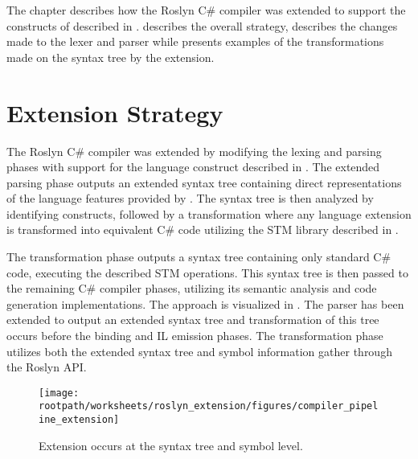 \makeatletter {}\makeatother
{}
The chapter describes how the Roslyn C\# compiler was extended to support the constructs of \stmname described in .  describes the overall strategy,  describes the changes made to the lexer and parser while  presents examples of the transformations made on the syntax tree by the extension.
\label{chap:roslyn_extension}
\section{Extension Strategy}
\label{sec:roslyn_extension_strategy}
The Roslyn C\# compiler was extended by modifying the lexing and parsing phases with support for the language construct described in . The extended parsing phase outputs an extended syntax tree containing direct representations of the language features provided by \stmname. The syntax tree is then analyzed by identifying \stmnamesp constructs, followed by a transformation where any language extension is transformed into equivalent C\# code utilizing the \ac{STM} library described in . 

The transformation phase outputs a syntax tree containing only standard C\# code, executing the described \ac{STM} operations. This syntax tree is then passed to the remaining C\# compiler phases, utilizing its semantic analysis and code generation implementations. The approach is visualized in . The parser has been extended to output an extended syntax tree and transformation of this tree occurs before the binding and IL emission phases. The transformation phase utilizes both the extended syntax tree and symbol information gather through the Roslyn \ac{API}.
\begin{figure}[htbp]
\centering
 \texttt{[image: \\rootpath/worksheets/roslyn\_extension/figures/compiler\_pipeline\_extension]} 
 \caption{Extension occurs at the syntax tree and symbol level.}
\label{fig:compiler_pipeline_extension}
\end{figure}

